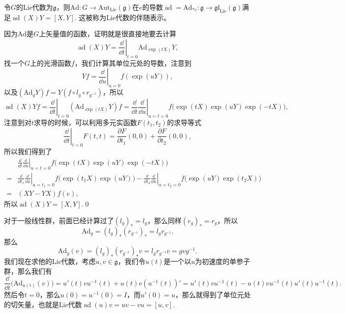 \documentclass[9pt]{extarticle}
\newcommand{\lag}{{\mathfrak{g}}}
\DeclareMathOperator{\ad}{ad}
\begin{document}

\pro 令$G$的Lie代数为$\lag$，则$\mathrm{Ad}:G\to \mathrm{Aut}_{\mathrm{Lie}}(\lag)$在$e$的导数$\ad=\mathrm{Ad}_{*e}:\lag\to \mathfrak{gl}_{\mathrm{Lie}}(\lag)$满足$\ad(X)Y=[X,Y]$. 这被称为Lie代数的伴随表示。

\proof 因为$\mathrm{Ad}$是$G$上矢量值的函数，证明就是很直接地要去计算
\[
	\ad(X)Y=\left.\frac{\dd}{\dd t}\right|_{t=0}\mathrm{Ad}_{\exp(tX)}Y,
\]
找一个$G$上的光滑函数$f$，我们计算其单位元处的导数，注意到
\[
	Yf=\left.\frac{\dd}{\dd u}\right|_{u=0}f(\exp(uY)),
\]
以及$(\mathrm{Ad}_{g}Y)f=Y(f\circ l_g\circ r_{g^{-1}})$，所以
\[
	\ad(X)Yf=\left.\frac{\dd}{\dd t}\right|_{t=0}(\mathrm{Ad}_{\exp(tX)}Y)f=\left.\frac{\dd}{\dd t}\frac{\dd}{\dd u}\right|_{u=t=0}f\bigl(\exp(tX)\exp(uY)\exp(-tX)\bigr),
\]
注意到对$t$求导的时候，可以利用多元实函数$F(t_1,t_2)$的求导等式
\[
	\left.\frac{\dd}{\dd t}\right|_{t=0}F(t,t)=\frac{\partial F}{\partial t_1}(0,0)+\frac{\partial F}{\partial t_2}(0,0),
\]
所以我们得到了
\[
\begin{split}
	&\left.\frac{\dd}{\dd t}\frac{\dd}{\dd u}\right|_{u=t=0}f\bigl(\exp(tX)\exp(uY)\exp(-tX)\bigr)\\
	=&\left.\frac{\dd}{\dd t_1}\frac{\dd}{\dd u}\right|_{u=t_1=0}f\bigl(\exp(t_1X)\exp(uY)\bigr)-\left.\frac{\dd}{\dd t_2}\frac{\dd}{\dd u}\right|_{u=t_2=0}f\bigl(\exp(uY)\exp(t_2X)\bigr)\\
	=&(XY-YX)f(e),
\end{split}
\]
所以$\ad(X)Y=[X,Y]$.\qed

\para 对于一般线性群，前面已经计算过了$(l_g)_*=l_g$，那么同样$(r_g)_*=r_g$，所以
\[
	\mathrm{Ad}_g=(l_g)_*(r_{g^{-1}})_*=l_gr_{g^{-1}}.
\]
那么
\[
	\mathrm{Ad}_g(v)=(l_g)_*(r_{g^{-1}})_*v=l_gr_{g^{-1}}v=gvg^{-1}.
\]
我们现在求他的Lie代数，考虑$u,v\in \lag$，我们令$u(t)$是一个以$u$为初速度的单参子群，那么我们有
\[
	\frac{\dd}{\dd t}\bigl(\mathrm{Ad}_{u(t)}(v)\bigr)=u'(t)vu^{-1}(t)+u(t)v(u^{-1}(t))'=u'(t)vu^{-1}(t)-u(t)vu^{-1}(t)u'(t)u^{-1}(t).
\]
然后令$t=0$，那么$u(0)=u^{-1}(0)=I$，而$u'(0)=u$，那么就得到了单位元处的切矢量，也就是Lie代数$\ad(u)v=uv-vu=[u,v]$.

\end{document}
